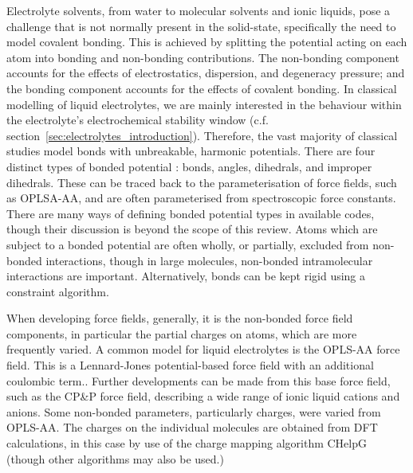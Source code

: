 \documentclass[../main.tex]{subfiles}
\begin{document}
Electrolyte solvents, from water to molecular solvents and ionic liquids, pose a challenge that is not normally present in the solid-state, specifically the need to model covalent bonding. This is achieved by splitting the potential acting on each atom into bonding and non-bonding contributions. The non-bonding component accounts for the effects of electrostatics, dispersion, and degeneracy pressure; and the bonding component accounts for the effects of covalent bonding. In classical modelling of liquid electrolytes, we are mainly interested in the behaviour within the electrolyte's electrochemical stability window (c.f. section~\ref{sec:electrolytes_introduction}). Therefore, the vast majority of classical studies model bonds with unbreakable, harmonic potentials. There are four distinct types of bonded potential \cite{lindahl_gromacs_2021, frenkel_understanding_2002}: bonds, angles, dihedrals, and improper dihedrals. These can be traced back to the parameterisation of force fields, such as OPLSA-AA,\cite{canongia_lopes_clp_2012, jorgensen_development_1996} and are often parameterised from spectroscopic force constants. There are many ways of defining bonded potential types in available codes,\cite{lindahl_gromacs_2021,PLIMPTON19951} though their discussion is beyond the scope of this review. Atoms which are subject to a bonded potential are often wholly, or partially, excluded from non-bonded interactions, though in large molecules, non-bonded intramolecular interactions are important. Alternatively, bonds can be kept rigid using a constraint algorithm.\cite{hess_lincs_1997,ryckaert_numerical_1977,andersen_rattle_1983}

When developing force fields, generally, it is the non-bonded force field components, in particular the partial charges on atoms, which are more frequently varied. A common model for liquid electrolytes is the OPLS-AA force field.\cite{jorgensen_development_1996} This is a Lennard-Jones potential-based force field with an additional coulombic term.\cite{ewald_berechnung_1921,darden_particle_1993,deserno_how_1998,yeh_ewald_1999}.
Further developments can be made from this base force field, such as the CP\&P force field,\cite{canongia_lopes_clp_2012, canongia_lopes_modeling_2004, canongia_lopes_molecular_2004, canongia_lopes_molecular_2006} describing a wide range of ionic liquid cations and anions. Some non-bonded parameters, particularly charges, were varied from OPLS-AA. The charges on the individual molecules are obtained from DFT calculations, in this case by use of the charge mapping algorithm CHelpG\cite{canongia_lopes_clp_2012} (though other algorithms may also be used.\cite{spackman_potential_1996,breneman_determining_1990,singh_approach_1984}) 
\end{document}
